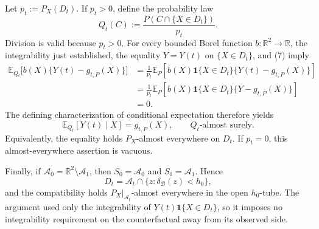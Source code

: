 Let \(p_t:=P_X(D_t)\). If \(p_t>0\), define the probability law
\[
 Q_t(C):=\frac{P(C\cap\{X\in D_t\})}{p_t}.
\]
Division is valid because \(p_t>0\). For every bounded Borel function \(b:\mathbb R^2\to\mathbb R\), the integrability just established, the equality \(Y=Y(t)\) on \(\{X\in D_t\}\), and (7) imply
\[
 \begin{aligned}
 \mathbb E_{Q_t}\bigl[b(X)\{Y(t)-g_{t,P}(X)\}\bigr]
 &=\frac{1}{p_t}\mathbb E_P\!\left[b(X)\mathbf 1\{X\in D_t\}
       \{Y(t)-g_{t,P}(X)\}\right]\\
 &=\frac{1}{p_t}\mathbb E_P\!\left[b(X)\mathbf 1\{X\in D_t\}
       \{Y-g_{t,P}(X)\}\right]\\
 &=0.
 \end{aligned}
\]
The defining characterization of conditional expectation therefore yields
\[
 \mathbb E_{Q_t}[Y(t)\mid X]=g_{t,P}(X),
 \qquad Q_t\text{-almost surely}.
\]
Equivalently, the equality holds \(P_X\)-almost everywhere on \(D_t\). If \(p_t=0\), this almost-everywhere assertion is vacuous.

Finally, if \(\mathcal A_0=\mathbb R^2\setminus\mathcal A_1\), then \(S_0=\mathcal A_0\) and \(S_1=\mathcal A_1\). Hence
\[
 D_t=\mathcal A_t\cap\{z:\delta_{\mathcal B}(z)<h_0\},
\]
and the compatibility holds \(P_X|_{\mathcal A_t}\)-almost everywhere in the open \(h_0\)-tube. The argument used only the integrability of \(Y(t)\mathbf 1\{X\in D_t\}\), so it imposes no integrability requirement on the counterfactual away from its observed side.